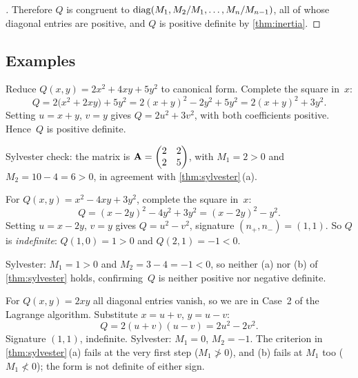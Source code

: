 \begin{proof}[]
Therefore $Q$ is congruent to
$\operatorname{diag}(M_1, M_2/M_1, \dots, M_n/M_{n-1})$, all of whose diagonal
entries are positive, and $Q$ is positive definite by
\cref{thm:inertia}.
\end{proof}

\subsection*{Examples}

\begin{example}
\label{ex:lagrange-pos-def}
Reduce $Q(x, y) = 2x^2 + 4xy + 5y^2$ to canonical form. Complete the
square in~$x$:
\[
  Q = 2\bigl(x^2 + 2xy\bigr) + 5y^2 = 2(x + y)^2 - 2y^2 + 5y^2 = 2(x + y)^2 + 3y^2.
\]
Setting $u = x + y$, $v = y$ gives $Q = 2u^2 + 3v^2$, with both
coefficients positive. Hence~$Q$ is positive definite.

Sylvester check: the matrix is $\mathbf{A} = \begin{pmatrix} 2 & 2 \\ 2 & 5 \end{pmatrix}$,
with $M_1 = 2 > 0$ and $M_2 = 10 - 4 = 6 > 0$, in agreement with
\cref{thm:sylvester}\,(a).
\end{example}

\begin{example}
\label{ex:lagrange-indefinite}
For $Q(x, y) = x^2 - 4xy + 3y^2$, complete the square in~$x$:
\[
  Q = (x - 2y)^2 - 4y^2 + 3y^2 = (x - 2y)^2 - y^2.
\]
Setting $u = x - 2y$, $v = y$ gives $Q = u^2 - v^2$, signature
$(n_+, n_-) = (1, 1)$. So $Q$ is \emph{indefinite}: $Q(1, 0) = 1 > 0$
and $Q(2, 1) = -1 < 0$.

Sylvester: $M_1 = 1 > 0$ and $M_2 = 3 - 4 = -1 < 0$, so neither (a)
nor (b) of \cref{thm:sylvester} holds, confirming~$Q$ is neither
positive nor negative definite.
\end{example}

\begin{example}[All-off-diagonal: $Q = 2xy$]
\label{ex:lagrange-off-diagonal}
For $Q(x, y) = 2xy$ all diagonal entries vanish, so we are in Case~2
of the Lagrange algorithm. Substitute $x = u + v$, $y = u - v$:
\[
  Q = 2(u + v)(u - v) = 2u^2 - 2v^2.
\]
Signature $(1, 1)$, indefinite. Sylvester: $M_1 = 0$, $M_2 = -1$.
The criterion in \cref{thm:sylvester}\,(a) fails at the very first
step ($M_1 \not> 0$), and (b) fails at $M_1$ too ($M_1 \not< 0$); the
form is not definite of either sign.
\end{example}

